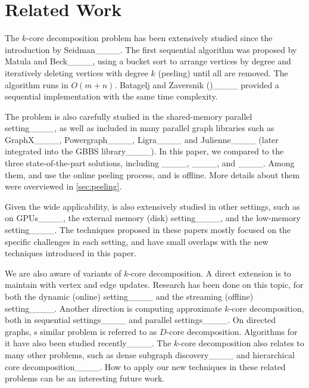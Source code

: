 \section{Related Work}
The $k$-core decomposition problem has been extensively studied since the introduction by Seidman____.
The first sequential algorithm was proposed by Matula and Beck____,
using a bucket sort to arrange vertices by degree and iteratively deleting vertices with degree $k$ (peeling) until all are removed.
The algorithm runs in $O(m + n)$.
Batagelj and Zaversnik (\BZ)____ provided a sequential implementation with the same time complexity. 

The \kcore{} problem is also carefully studied in the shared-memory parallel setting____, as well as included in many parallel graph libraries such as GraphX____, Powergraph____, Ligra____ and Julienne____ (later integrated into the GBBS library____).
In this paper, we compared to the three state-of-the-part solutions, including \ParK____, \PKC____, and \Julienne{}____.
Among them, \ParK and \PKC use the online peeling process, and \Julienne is offline.
More details about them were overviewed in \cref{sec:peeling}.

Given the wide applicability, \kcore is also extensively studied in other settings, such as on GPUs____, the external memory (disk) setting____, and the low-memory setting____.
The techniques proposed in these papers mostly focused on the specific challenges in each setting, and have small overlaps with the new techniques introduced in this paper.

We are also aware of variants of $k$-core decomposition.
A direct extension is to maintain \kcore with vertex and edge updates.
Research has been done on this topic, for both the dynamic (online) setting____ and the streaming (offline) setting____.
Another direction is computing approximate $k$-core decomposition, both in sequential settings____ 
and parallel settings____.
On directed graphs, s similar problem is referred to as $D$-core decomposition.
Algorithms for it have also been studied recently____.
The $k$-core decomposition also relates to many other problems, 
such as dense subgraph discovery____ and hierarchical core decomposition____.
How to apply our new techniques in these related problems can be an interesting future work.

